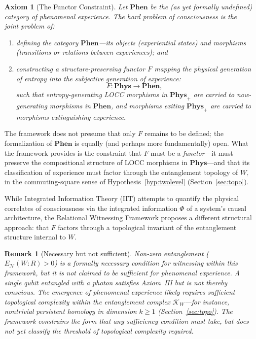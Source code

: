 \documentclass[11pt, a4paper]{article}
\newtheorem{axiom}{Axiom}
\newtheorem{remark}{Remark}
\begin{document}
\begin{axiom}[The Functor Constraint]
Let $\mathbf{Phen}$ be the (as yet formally undefined) category of phenomenal experience. The hard problem of consciousness is the \emph{joint} problem of:
\begin{enumerate}[label=(\roman*)]
    \item defining the category $\mathbf{Phen}$---its objects (experiential states) and morphisms (transitions or relations between experiences); and
    \item constructing a structure-preserving functor $F$ mapping the physical generation of entropy into the subjective generation of experience:
    \begin{equation}
    F : \mathbf{Phys} \longrightarrow \mathbf{Phen},
    \label{eq:functor}
    \end{equation}
    such that entropy-generating LOCC morphisms in $\mathbf{Phys}_+$ are carried to now-generating morphisms in $\mathbf{Phen}$, and morphisms exiting $\mathbf{Phys}_+$ are carried to morphisms extinguishing experience.
\end{enumerate}
\end{axiom}

The framework does not presume that only $F$ remains to be defined; the formalization of $\mathbf{Phen}$ is equally (and perhaps more fundamentally) open. What the framework provides is the constraint that $F$ must be a \emph{functor}---it must preserve the compositional structure of LOCC morphisms in $\mathbf{Phys}$---and that its classification of experience must factor through the entanglement topology of $W$, in the commuting-square sense of Hypothesis~\ref{hyp:twolevel} (Section~\ref{sec:topo}).

While Integrated Information Theory (IIT) \cite{Tononi2016} attempts to quantify the physical correlates of consciousness via the integrated information $\Phi$ of a system's causal architecture, the Relational Witnessing Framework proposes a different structural approach: that $F$ factors through a topological invariant of the entanglement structure internal to $W$.

\begin{remark}[Necessary but not sufficient]
Non-zero entanglement ($E_{\mathcal{N}}(W{:}R) > 0$) is a formally \emph{necessary} condition for witnessing within this framework, but it is not claimed to be \emph{sufficient} for phenomenal experience. A single qubit entangled with a photon satisfies Axiom~III but is not thereby conscious. The emergence of phenomenal experience likely requires sufficient topological complexity within the entanglement complex $\mathcal{K}_W$---for instance, nontrivial persistent homology in dimension $k \geq 1$ (Section~\ref{sec:topo}). The framework constrains the form that any sufficiency condition must take, but does not yet classify the threshold of topological complexity required.
\end{remark}
\end{document}
